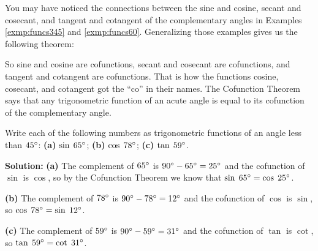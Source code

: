 You may have noticed the connections between the sine and cosine, secant and cosecant, and tangent
and cotangent of the complementary angles in Examples \ref{exmp:funcs345} and \ref{exmp:funcs60}.
Generalizing those examples gives us the following theorem:


So sine and cosine are cofunctions, secant and cosecant are cofunctions, and tangent and cotangent
are cofunctions. That is how the functions cosine, cosecant, and cotangent got the ``co'' in their
names. The Cofunction Theorem says that any trigonometric function of an acute angle is equal to
its cofunction of the complementary angle.\vspace{1mm}

\begin{exmp}
 Write each of the following numbers as trigonometric functions of an angle less than $45^\circ$:
\textbf{(a)} $\sin\;65^\circ$; \textbf{(b)} $\cos\;78^\circ$; \textbf{(c)}
 $\tan\;59^\circ$.\vspace{1mm}
\par\noindent\textbf{Solution:} \textbf{(a)} The complement of $65^\circ$ is $90^\circ -
 65^\circ = 25^\circ$ and the cofunction of $\sin$ is $\cos$, so by the Cofunction Theorem we
 know that $\sin\;65^\circ = \cos\;25^\circ$.

\par\noindent \textbf{(b)} The complement of $78^\circ$ is $90^\circ - 78^\circ =
12^\circ$ and the cofunction of $\cos$ is $\sin$, so $\cos\;78^\circ = \sin\;12^\circ$.

\par\noindent \textbf{(c)} The complement of $59^\circ$ is $90^\circ - 59^\circ =
31^\circ$ and the cofunction of $\tan$ is $\cot$, so $\tan\;59^\circ = \cot\;31^\circ$.
\end{exmp}\vspace{-2mm}
\divider


